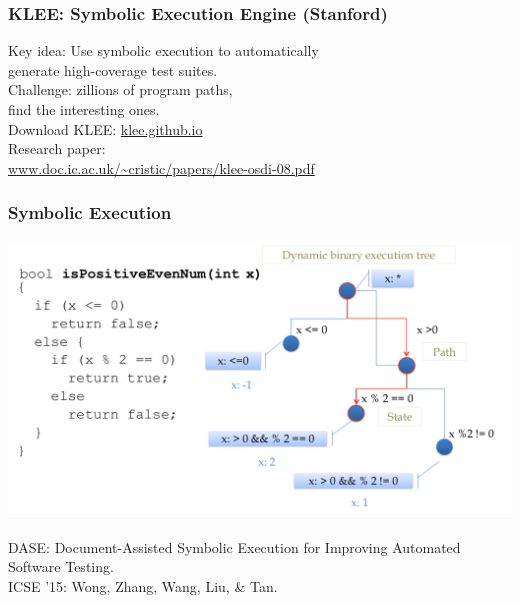 \documentclass{beamer}
\newenvironment{changemargin}[1]{%
  \begin{list}{}{%
    \setlength{\topsep}{0pt}%
    \setlength{\leftmargin}{#1}%
    \setlength{\rightmargin}{1em}
    \setlength{\listparindent}{\parindent}%
    \setlength{\itemindent}{\parindent}%
    \setlength{\parsep}{\parskip}%
  }%
  \item[]}{\end{list}}
\begin{document}
\begin{frame}
  \frametitle{KLEE: Symbolic Execution Engine (Stanford)}
  \begin{changemargin}{2cm}
    Key idea: Use symbolic execution to automatically\\
    \hspace*{1cm} generate high-coverage test suites.\\[1em]
    Challenge: zillions of program paths, \\
    \hspace*{1cm} find the interesting ones.
    \\[2em]
    Download KLEE: \url{klee.github.io}\\
    Research paper: \\
    \url{www.doc.ic.ac.uk/~cristic/papers/klee-osdi-08.pdf}
  \end{changemargin}
\end{frame}

\begin{frame}[fragile]
  \frametitle{Symbolic Execution}
  \includegraphics[width=.9\textwidth]{L11/dase.png}
  \scriptsize
  \begin{center}
  DASE: Document-Assisted Symbolic Execution for Improving Automated Software Testing.\\
  ICSE '15: Wong, Zhang, Wang, Liu, \& Tan.
  \end{center}
\end{frame}
\end{document}
